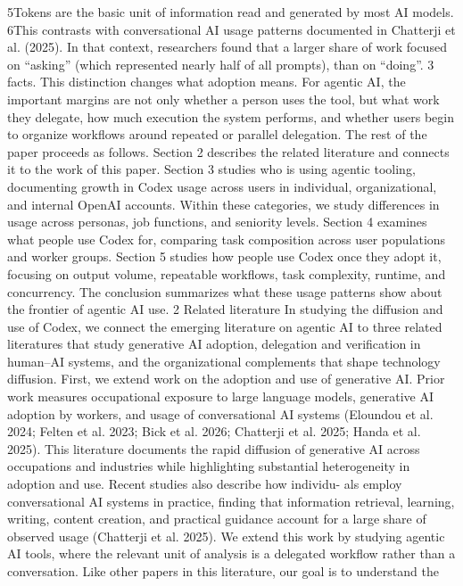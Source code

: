 5Tokens are the basic unit of information read and generated by most AI models.
6This contrasts with conversational AI usage patterns documented in Chatterji et al. (2025). In that context, researchers found
that a larger share of work focused on “asking” (which represented nearly half of all prompts), than on “doing”.
3
facts. This distinction changes what adoption means. For agentic AI, the important margins are not only
whether a person uses the tool, but what work they delegate, how much execution the system performs,
and whether users begin to organize workflows around repeated or parallel delegation.
The rest of the paper proceeds as follows. Section 2 describes the related literature and connects it
to the work of this paper. Section 3 studies who is using agentic tooling, documenting growth in Codex
usage across users in individual, organizational, and internal OpenAI accounts. Within these categories,
we study differences in usage across personas, job functions, and seniority levels. Section 4 examines
what people use Codex for, comparing task composition across user populations and worker groups.
Section 5 studies how people use Codex once they adopt it, focusing on output volume, repeatable
workflows, task complexity, runtime, and concurrency. The conclusion summarizes what these usage
patterns show about the frontier of agentic AI use.
2
Related literature
In studying the diffusion and use of Codex, we connect the emerging literature on agentic AI to three
related literatures that study generative AI adoption, delegation and verification in human–AI systems,
and the organizational complements that shape technology diffusion.
First, we extend work on the adoption and use of generative AI. Prior work measures occupational
exposure to large language models, generative AI adoption by workers, and usage of conversational AI
systems (Eloundou et al. 2024; Felten et al. 2023; Bick et al. 2026; Chatterji et al. 2025; Handa et al. 2025).
This literature documents the rapid diffusion of generative AI across occupations and industries while
highlighting substantial heterogeneity in adoption and use. Recent studies also describe how individu-
als employ conversational AI systems in practice, finding that information retrieval, learning, writing,
content creation, and practical guidance account for a large share of observed usage (Chatterji et al.
2025).
We extend this work by studying agentic AI tools, where the relevant unit of analysis is a delegated
workflow rather than a conversation. Like other papers in this literature, our goal is to understand the
